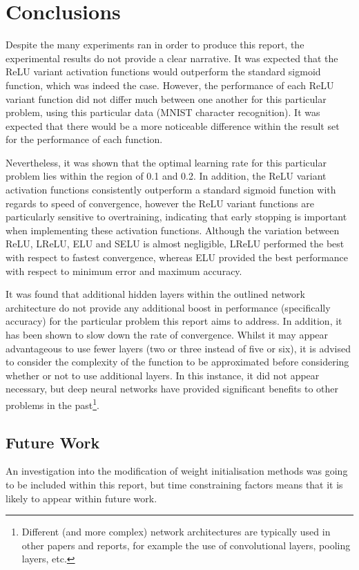 \documentclass{article}
\begin{document}
\section{Conclusions}
\label{sec:concl}

Despite the many experiments ran in order to produce this report, the experimental results do not provide a clear narrative. It was expected that the ReLU variant activation functions would outperform the standard sigmoid function, which was indeed the case. However, the performance of each ReLU variant function did not differ much between one another for this particular problem, using this particular data (MNIST character recognition). It was expected that there would be a more noticeable difference within the result set for the performance of each function. 

Nevertheless, it was shown that the optimal learning rate for this particular problem lies within the region of 0.1 and 0.2. In addition, the ReLU variant activation functions consistently outperform a standard sigmoid function with regards to speed of convergence, however the ReLU variant functions are particularly sensitive to overtraining, indicating that early stopping is important when implementing these activation functions. Although the variation between ReLU, LReLU, ELU and SELU is almost negligible, LReLU performed the best with respect to fastest convergence, whereas ELU provided the best performance with respect to minimum error and maximum accuracy.

It was found that additional hidden layers within the outlined network architecture do not provide any additional boost in performance (specifically accuracy) for the particular problem this report aims to address. In addition, it has been shown to slow down the rate of convergence. Whilst it may appear advantageous to use fewer layers (two or three instead of five or six), it is advised to consider the complexity of the function to be approximated before considering whether or not to use additional layers. In this instance, it did not appear necessary, but deep neural networks have provided significant benefits to other problems in the past\citep{krizhevsky2012imagenet}\footnote{Different (and more complex) network architectures are typically used in other papers and reports, for example the use of convolutional layers, pooling layers, etc.}.

\subsection{Future Work}

An investigation into the modification of weight initialisation methods was going to be included within this report, but time constraining factors means that it is likely to appear within future work.

\newpage


\end{document}
